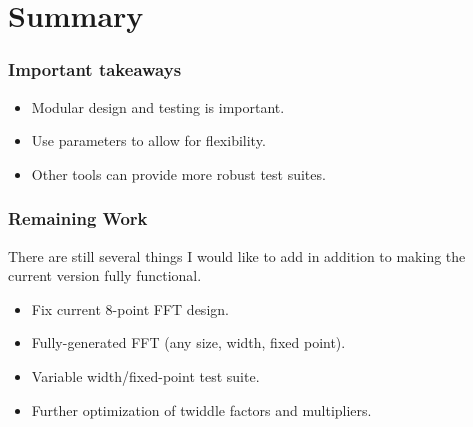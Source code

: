 \documentclass{beamer}
\begin{document}
\section{Summary}

\begin{frame}
	\frametitle{Important takeaways}
	\begin{itemize}
		\item Modular design and testing is important.
		\item Use parameters to allow for flexibility.
		\item Other tools can provide more robust test suites.
	\end{itemize}

\end{frame}

\begin{frame}
	\frametitle{Remaining Work}
	There are still several things I would like to add in addition to making
	the current version fully functional.
	\begin{itemize}
		\item Fix current 8-point FFT design.
		\item Fully-generated FFT (any size, width, fixed point).
		\item Variable width/fixed-point test suite.
		\item Further optimization of twiddle factors and multipliers.
	\end{itemize}

\end{frame}
\end{document}
